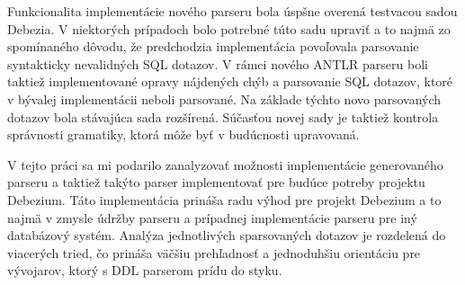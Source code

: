 Funkcionalita implementácie nového parseru bola úspšne overená testvacou sadou Debezia. V niektorých prípadoch bolo potrebné túto sadu upraviť a to najmä zo spomínaného dôvodu, že predchodzia implementácia povoľovala parsovanie syntakticky nevalidných SQL dotazov. V rámci nového ANTLR parseru boli taktiež implementované opravy nájdených chýb a parsovanie SQL dotazov, ktoré v bývalej implementácii neboli parsované. Na základe týchto novo parsovaných dotazov bola stávajúca sada rozšírená. Súčasťou novej sady je taktiež kontrola správnosti gramatiky, ktorá môže byť v budúcnosti upravovaná.

V tejto práci sa mi podarilo zanalyzovať možnosti implementácie generovaného parseru a taktiež takýto parser implementovať pre budúce potreby projektu Debezium. Táto implementácia prináša radu výhod pre projekt Debezium a to najmä v zmysle údržby parseru a prípadnej implementácie parseru pre iný databázový systém. Analýza jednotlivých sparsovaných dotazov je rozdelená do viacerých tried, čo prináša väčšiu prehľadnosť a jednoduhšiu orientáciu pre vývojarov, ktorý s DDL parserom prídu do styku.